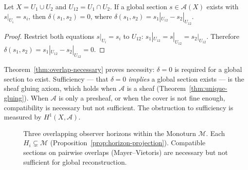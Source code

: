 \begin{theorem}
  \label{thm:overlap-necessary}
  \statusproven{}
  Let $X = U_1 \cup U_2$ and $U_{12} = U_1 \cap U_2$.
  If a global section $s \in \mathcal{A}(X)$ exists with
  $s|_{U_i} = s_i$, then $\delta(s_1,s_2) = 0$, where
  $\delta(s_1,s_2) = s_1|_{U_{12}} - s_2|_{U_{12}}$.
\end{theorem}

\begin{proof}
  Restrict both equations $s|_{U_i} = s_i$ to $U_{12}$:
  $s_1|_{U_{12}} = s|_{U_{12}} = s_2|_{U_{12}}$.
  Therefore $\delta(s_1,s_2) = s_1|_{U_{12}} - s_2|_{U_{12}} = 0$.
\end{proof}

\begin{TechNote}
  Theorem~\ref{thm:overlap-necessary} proves necessity:
  $\delta = 0$ is required for a global section to exist.
  Sufficiency --- that $\delta = 0$ \emph{implies} a global
  section exists --- is the sheaf gluing axiom, which holds
  when $\mathcal{A}$ is a sheaf
  (Theorem~\ref{thm:unique-gluing}).
  When $\mathcal{A}$ is only a presheaf, or when the cover
  is not fine enough, compatibility is necessary but not
  sufficient.
  The obstruction to sufficiency is measured by
  $H^1(X,\mathcal{A})$.
\end{TechNote}


\begin{figure}[ht]
\centering
{}
\caption{Three overlapping observer horizons within the Monoturn
         $\mathcal{M}$.
         Each $H_i \subsetneq \mathcal{M}$ (Proposition~\ref{prop:horizon-projection}).
         Compatible sections on pairwise overlaps (Mayer--Vietoris)
         are necessary but not sufficient for global reconstruction.}
\label{fig:horizon-cover}
\end{figure}

